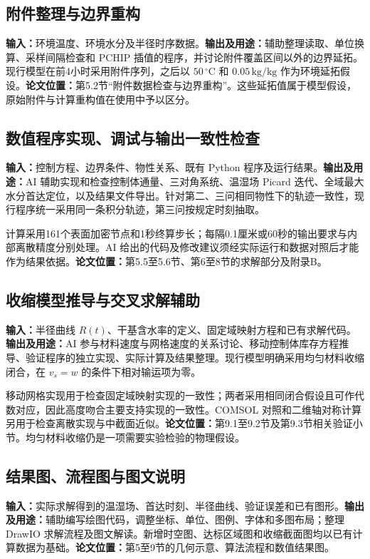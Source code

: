 \documentclass[withoutpreface,bwprint]{commons/cumcmthesis}
\newcommand{\field}[1]{\mbox{\textbf{#1：}}}
\begin{document}
\par\newpage
\subsection{附件整理与边界重构}
\field{输入}环境温度、环境水分及半径时序数据。\field{输出及用途}辅助整理读取、单位换算、采样间隔检查和 PCHIP 插值的程序，并讨论附件覆盖区间以外的边界延拓。现行模型在前4小时采用附件序列，之后以 $50\,{}^\circ\mathrm C$ 和 $0.05\,\mathrm{kg/kg}$ 作为环境延拓假设。\field{论文位置}第5.2节“附件数据检查与边界重构”。这些延拓值属于模型假设，原始附件与计算重构值在使用中予以区分。

\subsection{数值程序实现、调试与输出一致性检查}
\field{输入}控制方程、边界条件、物性关系、既有 Python 程序及运行结果。\field{输出及用途}AI 辅助实现和检查控制体通量、三对角系统、温湿场 Picard 迭代、全域最大水分首达定位，以及结果文件导出。针对第二、三问相同物性下的轨迹一致性，现行程序统一采用同一条积分轨迹，第三问按规定时刻抽取。

计算采用161个表面加密节点和1秒终算步长；每隔0.1厘米或60秒的输出要求与内部离散精度分别处理。AI 给出的代码及修改建议须经实际运行和数据对照后才能作为结果依据。\field{论文位置}第5.5至5.6节、第6至8节的求解部分及附录B。

\subsection{收缩模型推导与交叉求解辅助}
\field{输入}半径曲线 $R(t)$、干基含水率的定义、固定域映射方程和已有求解代码。\field{输出及用途}AI 参与材料速度与网格速度的关系讨论、移动控制体库存方程推导、验证程序的独立实现、实际计算及结果整理。现行模型明确采用均匀材料收缩闭合，在 $v_s=w$ 的条件下相对输运项为零。

移动网格实现用于检查固定域映射实现的一致性；两者采用相同闭合假设且可作代数对应，因此高度吻合主要支持实现的一致性。COMSOL 对照和二维轴对称计算另用于检查离散实现与中截面近似。\field{论文位置}第9.1至9.2节及第9.3节相关验证小节。均匀材料收缩仍是一项需要实验检验的物理假设。

\subsection{结果图、流程图与图文说明}
\field{输入}实际求解得到的温湿场、首达时刻、半径曲线、验证误差和已有图形。\field{输出及用途}辅助编写绘图代码，调整坐标、单位、图例、字体和多图布局；整理 DrawIO 求解流程及图文解读。新增时空图、达标区域图和收缩截面图均以已有计算数据为基础。\field{论文位置}第5至9节的几何示意、算法流程和数值结果图。
\end{document}
